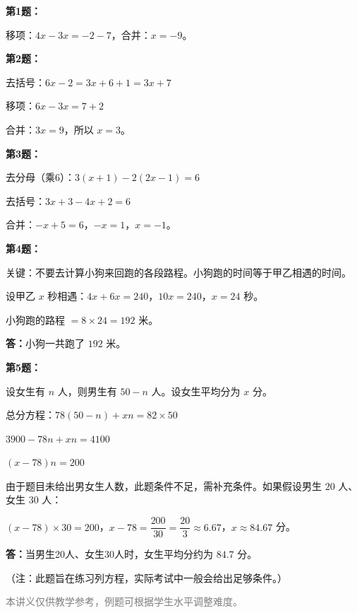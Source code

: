 \documentclass[12pt, a4paper]{ctexart}
\begin{document}
\begin{knowledgebox}[参考答案]
\textbf{第1题：}

移项：$4x-3x=-2-7$，合并：$x=-9$。

\medskip

\textbf{第2题：}

去括号：$6x-2=3x+6+1=3x+7$

移项：$6x-3x=7+2$

合并：$3x=9$，所以 $x=3$。

\medskip

\textbf{第3题：}

去分母（乘6）：$3(x+1)-2(2x-1)=6$

去括号：$3x+3-4x+2=6$

合并：$-x+5=6$，$-x=1$，$x=-1$。

\medskip

\textbf{第4题：}

关键：不要去计算小狗来回跑的各段路程。小狗跑的时间等于甲乙相遇的时间。

设甲乙 $x$ 秒相遇：$4x+6x=240$，$10x=240$，$x=24$ 秒。

小狗跑的路程 $=8\times 24=192$ 米。

\textbf{答：}小狗一共跑了 $192$ 米。

\medskip

\textbf{第5题：}

设女生有 $n$ 人，则男生有 $50-n$ 人。设女生平均分为 $x$ 分。

总分方程：$78(50-n)+xn=82\times 50$

$3900-78n+xn=4100$

$(x-78)n=200$

由于题目未给出男女生人数，此题条件不足，需补充条件。如果假设男生 $20$ 人、女生 $30$ 人：

$(x-78)\times 30=200$，$x-78=\dfrac{200}{30}=\dfrac{20}{3}\approx 6.67$，$x\approx 84.67$ 分。

\textbf{答：}当男生20人、女生30人时，女生平均分约为 $84.7$ 分。

（注：此题旨在练习列方程，实际考试中一般会给出足够条件。）
\end{knowledgebox}

\vfill
\begin{center}
\small\textcolor{gray}{本讲义仅供教学参考，例题可根据学生水平调整难度。}
\end{center}
\end{document}
